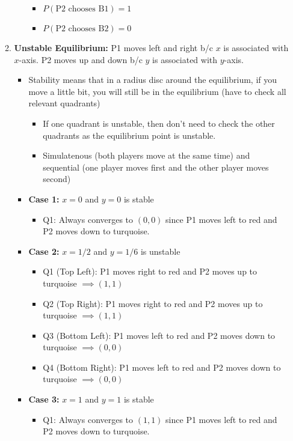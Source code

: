 \begin{example}
\begin{enumerate}
\begin{enumerate}
\begin{itemize}
\begin{itemize}
                    \item $P(\text{P2 chooses B1}) = 1$
                    \item $P(\text{P2 chooses B2}) = 0$
                \end{itemize}
            \end{itemize}
            \item \textbf{Unstable Equilibrium:} P1 moves left and right b/c $x$ is associated with $x$-axis. P2 moves up and down b/c $y$ is associated with $y$-axis.
            \begin{itemize}
                \item Stability means that in a radius disc around the equilibrium, if you move a little bit, you will still be in the equilibrium (have to check all relevant quadrants)
                \begin{itemize}
                    \item If one quadrant is unstable, then don't need to check the other quadrants as the equilibrium point is unstable. 
                    \item Simulatenous (both players move at the same time) and sequential (one player moves first and the other player moves second) 
                \end{itemize}
                \item \textbf{Case 1:} $x=0$ and $y=0$ is stable
                \begin{itemize}
                    \item Q1: Always converges to $(0,0)$ since P1 moves left to red and P2 moves down to turquoise.
                \end{itemize}
                \item \textbf{Case 2:} $x=1/2$ and $y=1/6$ is unstable
                \begin{itemize}
                    \item Q1 (Top Left): P1 moves right to red and P2 moves up to turquoise $\implies (1,1)$
                    \item Q2 (Top Right): P1 moves right to red and P2 moves up to turquoise $\implies (1,1)$
                    \item Q3 (Bottom Left): P1 moves left to red and P2 moves down to turquoise $\implies (0,0)$
                    \item Q4 (Bottom Right): P1 moves left to red and P2 moves down to turquoise $\implies (0,0)$
                \end{itemize}
                \item \textbf{Case 3:} $x=1$ and $y=1$ is stable
                \begin{itemize}
                    \item Q1: Always converges to $(1,1)$ since P1 moves left to red and P2 moves down to turquoise.
                \end{itemize}
            \end{itemize}
        \end{enumerate}
    \end{enumerate}


\end{example}
